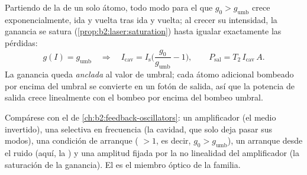 \begin{proposition}\label{prop:b2:laser:steady}
Partiendo de la  de un solo átomo, todo modo para el
que $g_0 > g_{\text{umb}}$ crece exponencialmente, ida y vuelta tras ida y
vuelta; al crecer su intensidad, la ganancia se satura
(\cref{prop:b2:laser:saturation}) hasta igualar exactamente las pérdidas:
\[
g(I) = g_{\text{umb}} \quad\Longrightarrow\quad
I_{\text{cav}} = I_{\text{s}}\Big(\frac{g_0}{g_{\text{umb}}} - 1\Big),
\qquad P_{\text{sal}} = T_2\,I_{\text{cav}}\,A .
\]
La ganancia queda \emph{anclada} al valor de umbral; cada átomo adicional
bombeado por encima del umbral se convierte en un fotón de salida, así que la potencia de salida
crece linealmente con el bombeo por encima del bombeo umbral.
\end{proposition}

\begin{remark}\label{rem:b2:laser:feedback}
Compárese con el  de
\cref{ch:b2:feedback-oscillators}: un amplificador (el medio invertido),
una  selectiva en frecuencia (la cavidad, que solo deja pasar sus modos),
una condición de arranque ( $> 1$, es decir, $g_0 > g_{\text{umb}}$),
un arranque desde el ruido (aquí, la ) y una amplitud fijada
por la no linealidad del amplificador (la saturación de la ganancia). El  es
el miembro óptico de la familia.
\end{remark}

